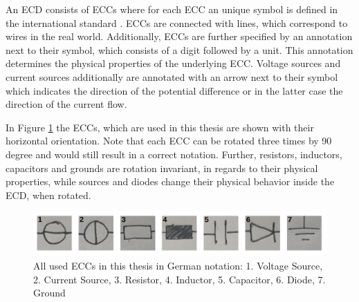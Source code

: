
An \ac{ECD} consists of \acp{ECC} where for each \ac{ECC} an unique symbol is defined in the international standard \cite{iec60617}.
\acp{ECC} are connected with lines, which correspond to wires in the real world.
Additionally, \acp{ECC} are further specified by an annotation next to their symbol, which consists of a digit followed by a unit.
This annotation determines the physical properties of the underlying \ac{ECC}.
Voltage sources and current sources additionally are annotated with an arrow next to their symbol which indicates the direction of the potential difference or in the latter case the direction of the current flow.

In Figure \ref{fig:used_eccs} the \acp{ECC}, which are used in this thesis are shown with their horizontal orientation.
Note that each \ac{ECC} can be rotated three times by 90 degree and would still result in a correct notation.
Further, resistors, inductors, capacitors and grounds are rotation invariant, in regards to their physical properties, while sources and diodes change their physical behavior inside the \ac{ECD}, when rotated.


\begin{figure}
\begin{center}
    \includegraphics[width=16cm]{imgs/eccs/all.png}
    \caption{All used \acp{ECC} in this thesis in German notation: 1. Voltage Source, 2. Current Source, 3. Resistor, 4. Inductor, 5. Capacitor, 6. Diode, 7. Ground}
    \label{fig:used_eccs}
\end{center}
\end{figure}

